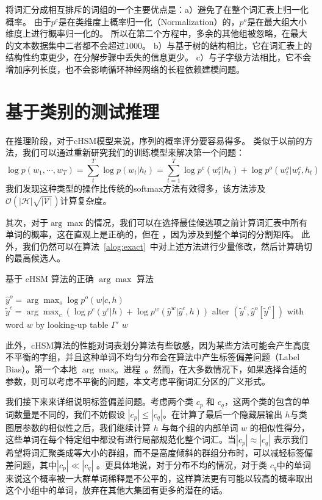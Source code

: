 将词汇分成相互排斥的词组的一个主要优点是：a）避免了在整个词汇表上归一化概率。 由于$ p ^ c $是在类维度上概率归一化（Normalization）的，$ p ^ o $是在最大组大小维度上进行概率归一化的。 所以在第二个方程中，多余的其他组被忽略，在最大的文本数据集中二者都不会超过1000。 b）与基于树的结构相比，它在词汇表上的结构性约束更少，在分解步骤中丢失的信息更少。 c）与子字级方法相比，它不会增加序列长度，也不会影响循环神经网络的长程依赖建模问题。



\section{基于类别的测试推理}
在推理阶段，对于cHSM模型来说，序列的概率评分要容易得多。
类似于以前的方法，我们可以通过重新研究我们的训练模型来解决第一个问题：
\begin{equation}\label{equ:class_inf}
   \log p(w_1,\cdots, w_T)=\sum_t^T\log p(w_t|h_t)=\sum_{t=1}^{T}\log p^c(w^c_t|h_t) +\log p^o(w^o_t|w^c_t,h_t)
\end{equation}
我们发现这种类型的操作比传统的softmax方法有效得多，该方法涉及$ \mathcal{O(|H|\sqrt{|V|})}$计算复杂度。

其次，对于$\arg\max $的情况，我们可以在选择最佳候选项之前计算词汇表中所有单词的概率，这在直观上是正确的，但在
，因为涉及到整个单词的分割矩阵。 此外，我们仍然可以在算法~\ref{alog:exact}~中对上述方法进行少量修改，然后计算确切的最高候选人。
\begin{algorithm}[!ht]
\caption{基于 cHSM 算法的正确 $\arg\max$ 算法}\label{alog:exact}
 $\hat y^o=\arg\max_o{\log p^o(w| c,h)}$ 
 $\tilde y^c=\arg\max_c{(\log p^c(y^c|h)+\log p^w(\hat y^w|\hat y^c,h))}$
 alter $(\tilde y^c,\hat y^o[\tilde y^c])$ with word $w$ by looking-up table $\Gamma'$ \;
 \Return $w$ \;
\end{algorithm}

此外，cHSM算法的性能对词表划分算法有些敏感，因为某些方法可能会产生高度不平衡的字组，并且这种单词不均匀分布会在算法中产生标签偏差问题（Label Bias）。第一个本地 $\arg\max_o$ 进程~。然而，在大多数情况下，如果选择合适的参数，则可以考虑不平衡的问题，本文考虑平衡词汇分区的广义形式。

我们接下来来详细说明标签偏差问题。考虑两个类 $ c_p $ 和 $ c_q $，这两个类的包含的单词数量是不同的，我们不妨假设 $| c_p | \le | c_q |$。在计算了最后一个隐藏层输出 $h$与类图层参数的相似性之后，我们继续计算 $h$ 与每个组的内部单词 $w$ 的相似性得分，这些单词在每个特定组中都没有进行局部规范化整个词汇。当$ | c_p | \approx|c_q|$ 表示我们希望将词汇聚类成等大小的群组，而不是高度倾斜的群组分布时，可以减轻标签偏差问题，其中$ | c_p | \ll | c_q | $ 。更具体地说，对于分布不均的情况，对于类 $ c_q $中的单词来说这个概率被一大群单词稀释是不公平的，这样算法更有可能以较高的概率取出这个小组中的单词，放弃在其他大集团有更多的潜在的话。

